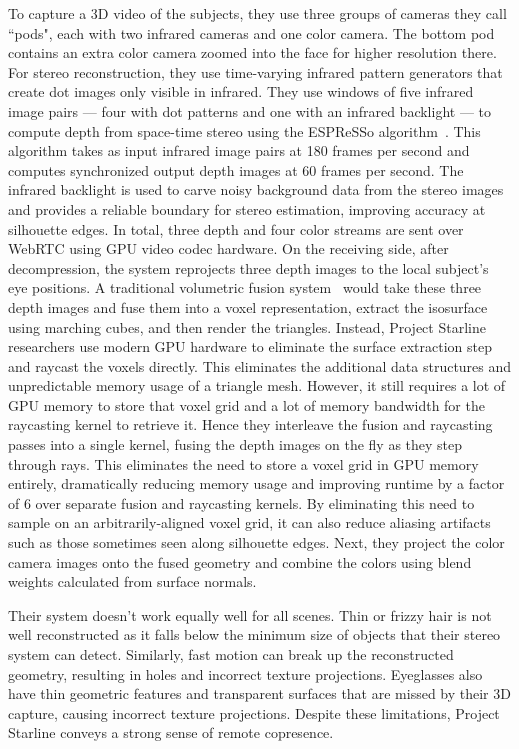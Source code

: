 To capture a 3D video of the subjects, they use three groups of cameras they call ``pods", each with two infrared cameras and one color camera. The bottom pod contains an extra color camera zoomed into the face for higher resolution there. For stereo reconstruction, they use time-varying infrared pattern generators that create dot images only visible in infrared. They use windows of five infrared image pairs --- four with dot patterns and one with an infrared backlight --- to compute depth from space-time stereo using the ESPReSSo algorithm~\cite{nover_espresso_2018}. This algorithm takes as input infrared image pairs at 180 frames per second and computes synchronized output depth images at 60 frames per second. The infrared backlight is used to carve noisy background data from the stereo images and provides a reliable boundary for stereo estimation, improving accuracy at silhouette edges. In total, three depth and four color streams are sent over WebRTC using GPU video codec hardware. On the receiving side, after decompression, the system reprojects three depth images to the local subject's eye positions. A traditional volumetric fusion system~\cite{curless_volumetric_1996} would take these three depth images and fuse them into a voxel representation, extract the isosurface using marching cubes, and then render the triangles. Instead, Project Starline researchers use modern GPU hardware to eliminate the surface extraction step and raycast the voxels directly. This eliminates the additional data structures and unpredictable memory usage of a triangle mesh. However, it still requires a lot of GPU memory to store that voxel grid and a lot of memory bandwidth for the raycasting kernel to retrieve it. Hence they interleave the fusion and raycasting passes into a single kernel, fusing the depth images on the fly as they step through rays. This eliminates the need to store a voxel grid in GPU memory entirely, dramatically reducing memory usage and improving runtime by a factor of 6 over separate fusion and raycasting kernels. By eliminating this need to sample on an arbitrarily-aligned voxel grid, it can also reduce aliasing artifacts such as those sometimes seen along silhouette edges. Next, they project the color camera images onto the fused geometry and combine the colors using blend weights calculated from surface normals.

Their system doesn't work equally well for all scenes. Thin or frizzy hair is not well reconstructed as it falls below the minimum size of objects that their stereo system can detect. Similarly, fast motion can break up the reconstructed geometry, resulting in holes and incorrect texture projections. Eyeglasses also have thin geometric features and transparent surfaces that are missed by their 3D capture, causing incorrect texture projections. Despite these limitations, Project Starline conveys a strong sense of remote copresence.

